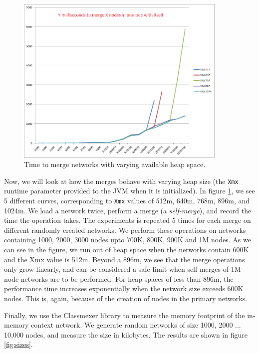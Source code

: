 \begin{figure}[t]
\centering
\includegraphics[width=0.9\textwidth]{media/chapter5/perf/selfmerge-increasing-xmx.png}
\caption{Time to merge networks with varying available heap space.}
\label{fig:agg-xmx}
\end{figure}


Now, we will look at how the merges behave with varying heap size (the \texttt{Xmx} runtime parameter provided to the JVM when it is initialized). In figure \ref{fig:agg-xmx}, we see 5 different curves, corresponding to \texttt{Xmx} values of 512m, 640m, 768m, 896m, and 1024m. We load a network twice, perform a merge (a \textit{self-merge}), and record the time the operation takes. The experiments is repeated 5 times for each merge on different randomly created networks. We perform these operations on networks containing 1000, 2000, 3000 nodes upto 700K, 800K, 900K and 1M nodes. As we can see in the figure, we run out of heap space when the networks contain 600K and the Xmx value is 512m. Beyond a 896m, we see that the merge operations only grow linearly, and can be considered a safe limit when self-merges of 1M node networks are to be performed. For heap spaces of less than 896m, the performance time increases exponentially when the network size exceeds 600K nodes. This is, again, because of the creation of nodes in the primary networks.

Finally, we use the Classmexer library \cite{classmexer} to measure the memory footprint of the in-memory context network. We generate random networks of size 1000, 2000 ... 10,000 nodes, and measure the size in kilobytes. The results are shown in figure \ref{fig:sizes}.


